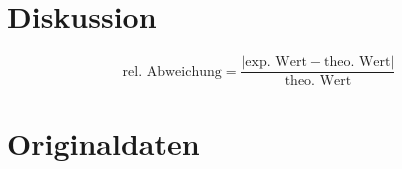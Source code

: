 \section{Diskussion}
\label{sec:Diskussion}
$$\text{rel. Abweichung} = \frac{|\text{exp. Wert} - \text{theo. Wert}|}{\text{theo. Wert}}$$
\section{Originaldaten}
\label{sec:Originaldaten}
